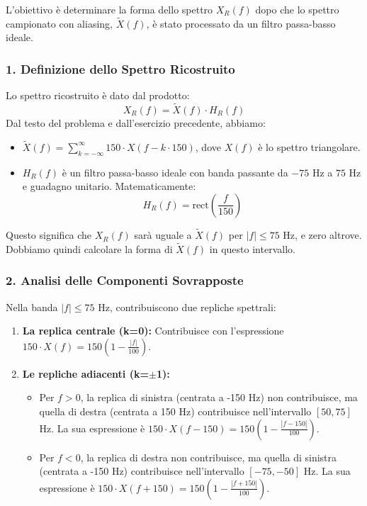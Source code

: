 \begin{soluzione}{7}
    L'obiettivo è determinare la forma dello spettro $X_R(f)$ dopo che lo spettro campionato con aliasing, $\tilde{X}(f)$, è stato processato da un filtro passa-basso ideale.
    \subsubsection*{1. Definizione dello Spettro Ricostruito}
    Lo spettro ricostruito è dato dal prodotto:
    \[
        X_R(f) = \tilde{X}(f) \cdot H_R(f)
    \]
    Dal testo del problema e dall'esercizio precedente, abbiamo:
    \begin{itemize}
        \item $\tilde{X}(f) = \sum_{k=-\infty}^{\infty} 150 \cdot X(f - k \cdot 150)$, dove $X(f)$ è lo spettro triangolare.
        \item $H_R(f)$ è un filtro passa-basso ideale con banda passante da $-75$ Hz a $75$ Hz e guadagno unitario. Matematicamente:
        \[
             H_R(f) = \text{rect}\left(\frac{f}{150}\right)
        \]
    \end{itemize}
    Questo significa che $X_R(f)$ sarà uguale a $\tilde{X}(f)$ per $|f| \le 75$ Hz, e zero altrove. Dobbiamo quindi calcolare la forma di $\tilde{X}(f)$ in questo intervallo.

    \subsubsection*{2. Analisi delle Componenti Sovrapposte}
    {\sloppy
    Nella banda $|f| \le 75$ Hz, contribuiscono due repliche spettrali:
    \begin{enumerate}
        \item \textbf{La replica centrale (k=0):} Contribuisce con l'espressione $150 \cdot X(f) = 150 \left(1 - \frac{|f|}{100}\right)$.
        \item \textbf{Le repliche adiacenti (k=$\pm$1):} 
            \begin{itemize}
                \item Per $f > 0$, la replica di sinistra (centrata a -150 Hz) non contribuisce, ma quella di destra (centrata a 150 Hz) contribuisce nell'intervallo $[50, 75]$ Hz. La sua espressione è $150 \cdot X(f-150) = 150 \left(1 - \frac{|f-150|}{100}\right)$.
                \item Per $f < 0$, la replica di destra non contribuisce, ma quella di sinistra (centrata a -150 Hz) contribuisce nell'intervallo $[-75, -50]$ Hz. La sua espressione è $150 \cdot X(f+150) = 150 \left(1 - \frac{|f+150|}{100}\right)$.
            \end{itemize}
    \end{enumerate}
    }
    

\end{soluzione}
